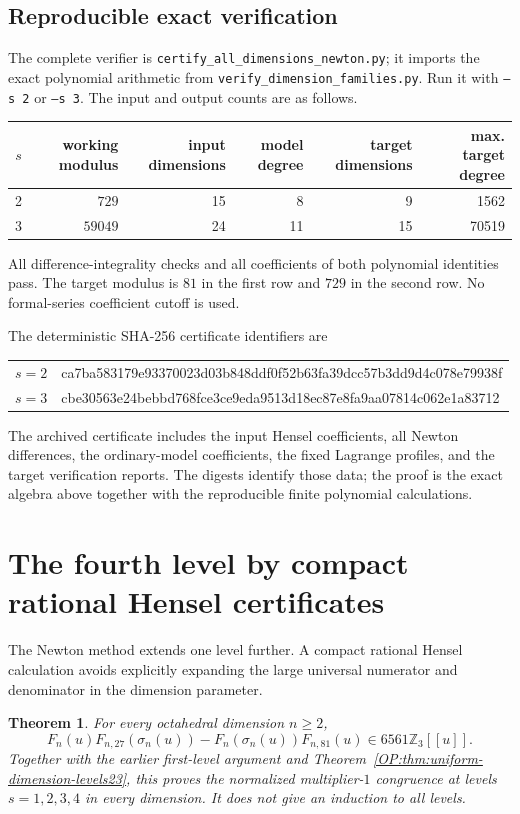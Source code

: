 \documentclass[11pt,a4paper]{article}
\newtheorem{theorem}{Theorem}[section]
\theoremstyle{definition}\newtheorem{definition}[theorem]{Definition}
\theoremstyle{remark}\newtheorem{remark}[theorem]{Remark}
\numberwithin{equation}{section}
\begin{document}
\subsection{Reproducible exact verification}
The complete verifier is
\texttt{certify\_all\_dimensions\_newton.py}; it imports the exact
polynomial arithmetic from \texttt{verify\_dimension\_families.py}.
Run it with \texttt{--s 2} or \texttt{--s 3}.
The input and output counts are as follows.
\begin{center}
\setlength{\tabcolsep}{4pt}\small
\begin{tabular}{c|r|r|r|r|r}
$s$&working modulus&input dimensions&model degree&target dimensions&max. target degree\\
\hline
2&$729$&15&8&9&1562\\
3&$59049$&24&11&15&70519
\end{tabular}
\end{center}
All difference-integrality checks and all coefficients of both
polynomial identities pass.  The target modulus is $81$ in the first
row and $729$ in the second row.  No formal-series coefficient cutoff
is used.

The deterministic SHA-256 certificate identifiers are
\begin{center}\ttfamily\small
\begin{tabular}{c|l}
$s=2$&ca7ba583179e93370023d03b848ddf0f52b63fa39dcc57b3dd9d4c078e79938f\\
$s=3$&cbe30563e24bebbd768fce3ce9eda9513d18ec87e8fa9aa07814c062e1a83712
\end{tabular}
\end{center}
The archived certificate includes the input Hensel coefficients, all
Newton differences, the ordinary-model coefficients, the fixed
Lagrange profiles, and the target verification reports.  The digests
identify those data; the proof is the exact algebra above together with
the reproducible finite polynomial calculations.
\section{The fourth level by compact rational Hensel certificates}\label{OP:source-main-9}
\label{OP:sec:dimension-newton-level4}

The Newton method extends one level further.  A compact rational
Hensel calculation avoids explicitly expanding the large universal
numerator and denominator in the dimension parameter.

\begin{theorem}\label{OP:thm:uniform-dimension-level4}
For every octahedral dimension $n\geq2$,
\[
 F_n(u)F_{n,27}(\sigma_n(u))-
 F_n(\sigma_n(u))F_{n,81}(u)
                         \in6561\mathbb Z_3[[u]].
\]
Together with the earlier first-level argument and
Theorem~\ref{OP:thm:uniform-dimension-levels23}, this proves the normalized
multiplier-$1$ congruence at levels $s=1,2,3,4$ in every dimension.
It does not give an induction to all levels.
\end{theorem}
\end{document}

